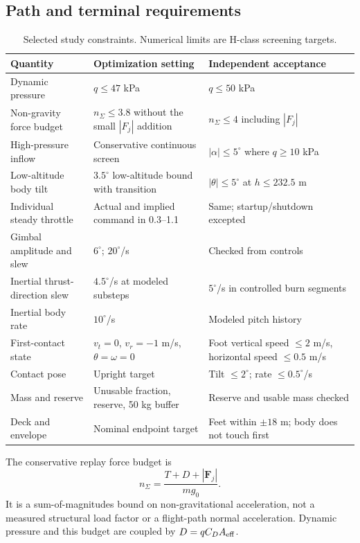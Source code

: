 \documentclass[11pt,a4paper]{article}
\newcommand{\vect}[1]{\bm{#1}}
\begin{document}
\subsection{Path and terminal requirements}
\begin{table}[htbp]
\caption{Selected study constraints. Numerical limits are H-class screening targets.}
\label{tab:constraints}
\small
\begin{tabularx}{\linewidth}{@{}p{.34\linewidth}XX@{}}
\toprule
Quantity & Optimization setting & Independent acceptance\\
\midrule
Dynamic pressure & $q\le47$ kPa & $q\le50$ kPa\\
Non-gravity force budget & $n_\Sigma\le3.8$ without the small $|F_j|$ addition & $n_\Sigma\le4$ including $|F_j|$\\
High-pressure inflow & Conservative continuous screen & $|\alpha|\le5^\circ$ where $q\ge10$ kPa\\
Low-altitude body tilt & $3.5^\circ$ low-altitude bound with transition & $|\theta|\le5^\circ$ at $h\le232.5$ m\\
Individual steady throttle & Actual and implied command in 0.3--1.1 & Same; startup/shutdown excepted\\
Gimbal amplitude and slew & $6^\circ$; $20^\circ$/s & Checked from controls\\
Inertial thrust-direction slew & $4.5^\circ$/s at modeled substeps & $5^\circ$/s in controlled burn segments\\
Inertial body rate & $10^\circ$/s & Modeled pitch history\\
First-contact state & $v_t=0$, $v_r=-1$ m/s, $\theta=\omega=0$ & Foot vertical speed $\le2$ m/s, horizontal speed $\le0.5$ m/s\\
Contact pose & Upright target & Tilt $\le2^\circ$; rate $\le0.5^\circ$/s\\
Mass and reserve & Unusable fraction, reserve, 50 kg buffer & Reserve and usable mass checked\\
Deck and envelope & Nominal endpoint target & Feet within $\pm18$ m; body does not touch first\\
\bottomrule
\end{tabularx}
\end{table}

The conservative replay force budget is
\begin{equation}
 n_\Sigma=\frac{T+D+|\vect F_j|}{mg_0}.
\label{eq:nsum}
\end{equation}
It is a sum-of-magnitudes bound on non-gravitational acceleration, not a measured structural load factor or a flight-path normal acceleration. Dynamic pressure and this budget are coupled by $D=qC_DA_{\rm eff}$.
\end{document}
